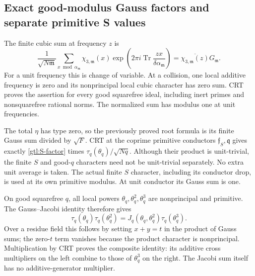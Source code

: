 \subsection{Exact good-modulus Gauss factors and separate primitive S values}
\label{gtl:root-proof}
The finite cubic sum at frequency $z$ is
\begin{equation}\label{gtl:frequency-sum}
 \frac1{\sqrt{N\mathfrak m}}\sum_{x\bmod\alpha_{\mathfrak m}}
       \chi_{3,\mathfrak m}(x)
        \exp\!\left(2\pi i\operatorname{Tr}
                   \frac{zx}{\delta\alpha_{\mathfrak m}}\right)
       =\overline{\chi_{3,\mathfrak m}(z)}G_{\mathfrak m}.
\end{equation}
For a unit frequency this is change of variable.
At a collision, one local additive frequency is zero and its
nonprincipal local cubic character has zero sum. CRT proves
the assertion for every good squarefree ideal, including
inert primes and nonsquarefree rational norms.
The normalized sum has modulus one at unit frequencies.

The total $\eta$ has type zero, so the previously proved
root formula is its finite Gauss sum divided by $\sqrt F$.
CRT at the coprime primitive conductors
$\mathfrak f_S,\mathfrak q$ gives exactly
\eqref{gtl:S-factor} times $\tau_q(\theta_q)/\sqrt{Nq}$.
Although their product is unit-trivial, the finite $S$ and
good-$q$ characters need not be unit-trivial separately.
No extra unit average is taken. The actual finite
$S$ character, including its conductor drop, is used at its
own primitive modulus. At unit conductor its Gauss sum is one.

On good squarefree $q$, all local powers
$\theta_q,\theta_q^2,\theta_q^3$ are nonprincipal and primitive.
The Gauss--Jacobi identity therefore gives
\begin{equation}\label{gtl:Gauss-Jacobi}
 \tau_q(\theta_q)\tau_q(\theta_q^2)
       =J_q(\theta_q,\theta_q^2)\tau_q(\theta_q^3).
\end{equation}
Over a residue field this follows by setting $x+y=t$ in the
product of Gauss sums; the zero-$t$ term vanishes because
the product character is nonprincipal. Multiplication by CRT
proves the composite identity: its additive cross multipliers
on the left combine to those of $\theta_q^3$ on the right.
The Jacobi sum itself has no additive-generator multiplier.

